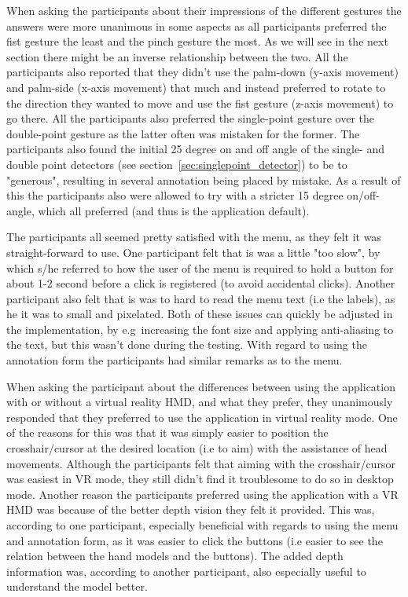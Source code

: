 When asking the participants about their impressions of the different gestures the answers were more unanimous in some aspects
as all participants preferred the fist gesture the least and the pinch gesture the most. As we will see in the next section there might be an inverse relationship between the two.
All the participants also reported that they didn't use the palm-down (y-axis movement) and palm-side (x-axis movement) that much and instead preferred to rotate to the 
direction they wanted to move and use the fist gesture (z-axis movement) to go there. All the participants also preferred the single-point gesture over the double-point gesture as 
the latter often was mistaken for the former. The participants also found the initial 25 degree on and off angle of the single- and double point detectors 
(see section~\vref{sec:singlepoint_detector}) to be to "generous", resulting in several annotation being placed by mistake. 
As a result of this the participants also were allowed to try with a stricter 15 degree on/off-angle, which all preferred (and thus is the application default).

The participants all seemed pretty satisfied with the menu, as they felt it was straight-forward to use. One participant felt that is was a little "too slow", by which
s/he referred to how the user of the menu is required to hold a button for about 1-2 second before a click is registered (to avoid accidental clicks).
Another participant also felt that is was to hard to read the menu text (i.e the labels), as he it was to small and pixelated. Both of these issues 
can quickly be adjusted in the implementation, by e.g~increasing the font size and applying anti-aliasing to the text, but this wasn't done during the testing.
With regard to using the annotation form the participants had similar remarks as to the menu. 

When asking the participant about the differences between using the application with or without a virtual reality HMD, and what they prefer, they unanimously responded
that they preferred to use the application in virtual reality mode. One of the reasons for this was that it was simply easier to position the crosshair/cursor at the 
desired location (i.e to aim) with the assistance of head movements. Although the participants felt that aiming with the crosshair/cursor was easiest in VR mode, they still 
didn't find it troublesome to do so in desktop mode. Another reason the participants preferred using the application with a VR HMD was because of the 
better depth vision they felt it provided. This was, according to one participant, especially beneficial with regards to using the menu and annotation form, as it 
was easier to click the buttons (i.e easier to see the relation between the hand models and the buttons). The added depth information was, according to another participant, 
also especially useful to understand the model better. 

